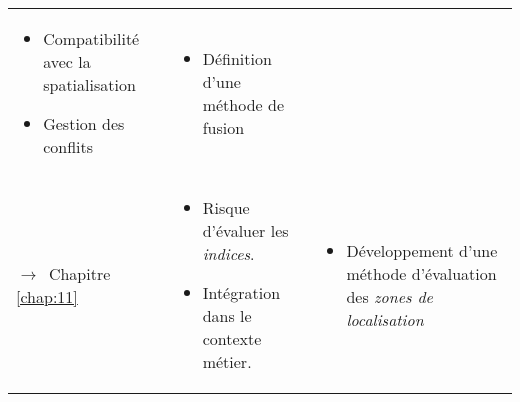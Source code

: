 \begin{tabular}{p{.2\textheight}>{\small}L{.35\textheight}>{\small}L{.35\textheight}}
\begin{minipage}[t]{.35\textheight}
    \begin{itemize}
    \item Compatibilité avec la spatialisation
    \item Gestion des conflits
    \end{itemize}
  \end{minipage}& \begin{minipage}[t]{.35\textheight}
    \begin{itemize}
    \item Définition d'une méthode de fusion
    \end{itemize}
  \end{minipage} \\
{\par\footnotesize\hspace{.25cm}$\longrightarrow$~Chapitre
\ref{chap:11}} & \begin{minipage}[t]{.35\textheight} \small
    \begin{itemize}
    \item Risque d'évaluer les \emph{indices}.
    \item Intégration dans le contexte métier.
    \end{itemize}
  \end{minipage}& \begin{minipage}[t]{.35\textheight}
    \begin{itemize}
    \item Développement d'une méthode d'évaluation des \emph{zones de
        localisation}
    \end{itemize}
  \end{minipage}\\
  \bottomrule
\end{tabular}
